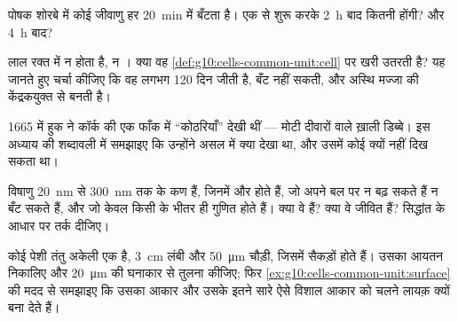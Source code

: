 \begin{exercise}[$\star\star$]\label{exo:g10:cells-common-unit:11}
पोषक शोरबे में कोई जीवाणु हर \qty{20}{min} में बँटता है। एक  से
शुरू करके \qty{2}{h} बाद कितनी होंगी? और \qty{4}{h} बाद?
\end{exercise}

\begin{exercise}[$\star\star\star$]\label{exo:g10:cells-common-unit:12}
लाल रक्त  में न  होता है, न । क्या वह
\cref{def:g10:cells-common-unit:cell} पर खरी उतरती है? यह जानते हुए चर्चा
कीजिए कि वह लगभग 120 दिन जीती है, बँट नहीं सकती, और अस्थि मज्जा की
केंद्रकयुक्त  से बनती है।
\end{exercise}

\begin{exercise}[$\star\star\star$]\label{exo:g10:cells-common-unit:13}
1665 में हुक ने कॉर्क की एक फाँक में ``कोठरियाँ'' देखी थीं --- मोटी
दीवारों वाले ख़ाली डिब्बे। इस अध्याय की शब्दावली में समझाइए कि उन्होंने
असल में क्या देखा था, और उसमें कोई  क्यों नहीं दिख सकता था।
\end{exercise}

\begin{exercise}[$\star\star\star$]\label{exo:g10:cells-common-unit:14}
विषाणु \qty{20}{nm} से \qty{300}{nm} तक के कण हैं, जिनमें  और  होते हैं, जो अपने बल पर न बढ़ सकते हैं न बँट सकते हैं,
और जो केवल किसी  के भीतर ही गुणित होते हैं। क्या वे  हैं?
क्या वे जीवित हैं?  सिद्धांत के आधार पर तर्क दीजिए।
\end{exercise}

\begin{exercise}[$\star\star\star$]\label{exo:g10:cells-common-unit:15}
कोई पेशी तंतु अकेली एक  है, \qty{3}{cm} लंबी और \qty{50}{\micro m}
चौड़ी, जिसमें सैकड़ों  होते हैं। उसका आयतन निकालिए और
\qty{20}{\micro m} की घनाकार  से तुलना कीजिए; फिर
\cref{ex:g10:cells-common-unit:surface} की मदद से समझाइए कि उसका आकार
और उसके इतने सारे  ऐसे विशाल आकार को चलने लायक़ क्यों बना देते
हैं।
\end{exercise}

